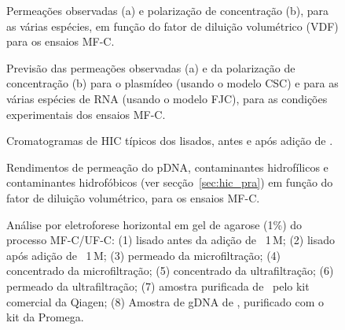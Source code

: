 \begin{figure}[!t]
	\centering
	
	\caption[Previsão das permeações e da polarização de concentração (MF-C)]{Permeações observadas (a) e polarização de concentração (b), para as várias espécies, em função do fator de diluição volumétrico (VDF) para os ensaios MF-C.}
	\label{fig:3bdart3}
\end{figure}
\begin{figure}[!t]
	\centering
	
	\caption[Permeação e da polarização de concentração em função de \raioporo\ (MF-C)]{Previsão das permeações observadas (a) e da polarização de concentração (b) para o plasmídeo (usando o modelo CSC) e para as várias espécies de RNA (usando o modelo FJC), para as condições experimentais dos ensaios MF-C.}
	\label{fig:4abart3}
\end{figure}
\begin{figure}[!t]
	\centering
	\setlength\figureheight{6cm} 
	\setlength\figurewidth{6cm}
	
	\caption[Cromatogramas de HIC típicos dos lisados]{Cromatogramas de HIC típicos dos lisados, antes e após adição de \cacldois.}
	\label{fig:4cart3}
\end{figure}
\begin{figure}[!t]
	\centering
	\setlength\figureheight{6cm} 
	\setlength\figurewidth{6cm}
	
	\caption[Rendimentos de permeação de pDNA e contaminantes (MF-C)]{Rendimentos de permeação do pDNA, contaminantes hidrofílicos e contaminantes hidrofóbicos (ver secção~\ref{sec:hic_pra}) em função do fator de diluição volumétrico, para os ensaios MF-C.}
	\label{fig:3fart3}
\end{figure}
\begin{figure}%
\centering
{}
\caption[Eletroforese horizontal em gel de agarose do processo MF-C/UF-C]{Análise por eletroforese horizontal em gel de agarose (1\%) do processo MF-C/UF-C: (1) lisado antes da adição de \cacldois\ 1\,M; (2) lisado após adição de \cacldois\ 1\,M; (3) permeado da microfiltração; (4) concentrado da microfiltração; (5) concentrado da ultrafiltração; (6) permeado da ultrafiltração; (7) amostra purificada de \pVAX\ pelo kit comercial da Qiagen; (8) Amostra de gDNA de \ecolidh, purificado com o kit da Promega.}
\label{fig:4dart3}
\end{figure}

